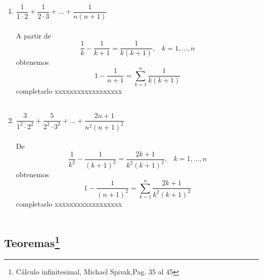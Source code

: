 \begin{ej}
\begin{enumerate}[\bfseries i)]
\item $\dfrac{1}{1 \cdot 2} + \dfrac{1}{2 \cdot 3} + ... + \dfrac{1}{n(n+1)}$\\\\ 
A partir de $$\dfrac{1}{k} - \dfrac{1}{k+1} = \dfrac{1}{k(k+1)}, \; \; \; k=1,...,n$$ obtenemos $$1-\dfrac{1}{n+1} = \displaystyle\sum_{k=1}^n \dfrac{1}{k(k+1)}$$ {\color{green} completarlo xxxxxxxxxxxxxxxxxx}\\\\

\item $\dfrac{3}{1^2 \cdot 2^2} + \dfrac{5}{2^2 \cdot 3^2} + ... + \dfrac{2n +1}{n^2 (n+1)^2}$\\\\
De $$\dfrac{1}{k^2} - \dfrac{1}{(k+1)^2} = \dfrac{2k+1}{k^2(k+1)^2}, \; \; \; k=1,...,n$$ obtenemos $$1-\dfrac{1}{(n+1)^2} = \displaystyle\sum_{k=1}^n \dfrac{2k+1}{k^2(k+1)^2}$$ {\color{green} completarlo xxxxxxxxxxxxxxxxxx} \\\\
\end{enumerate}
\end{ej}

\subsection[Teoremas]{Teoremas\footnote{Cálculo infinitesimal, Michael Spivak,Pag. 35 al 45}}

